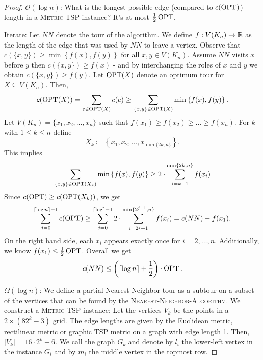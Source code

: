 \documentclass[../skript.tex]{subfiles}
\begin{document}
\begin{proof}
$\mathcal{O}(\log n)$: What is the longest possible edge (compared to $c(\operatorname{OPT})$) length in a \textsc{Metric TSP} instance? It's at most $\frac{1}{2} \operatorname{OPT}$.

Iterate: Let $NN$ denote the tour of the algorithm. We define $f : V(K_n) \to \mathbb{R}$ as the length of the edge that was used by $NN$ to leave a vertex. Observe that $c(\{ x, y \}) \geq \min \left\{ f(x), f(y) \right\}$ for all $x, y \in V(K_n)$.
Assume $NN$ visits $x$ before $y$ then $c(\{ x, y\}) \geq f(x)$ - and by interchanging the roles of $x$ and $y$ we obtain $c(\{x, y\}) \geq f(y)$.
Let $\operatorname{OPT}(X)$ denote an optimum tour for $X \subseteq V(K_n)$. Then,
\[
	c(\operatorname{OPT}(X)) = \sum_{e \in \operatorname{OPT}(X)} c(e) \geq \sum_{\{x, y\} \in \operatorname{OPT}(X)} \min\left\{ f(x), f(y) \right\}.
\]
Let $V(K_n) = \{ x_1, x_2, \ldots, x_n \}$ such that $f(x_1) \geq f(x_2) \geq \ldots \geq f(x_n)$.
For $k$ with $1 \leq k \leq n$ define
\[
	X_k \coloneqq \left\{ x_1, x_2, \ldots, x_{\min\{2k, n\}} \right\}.
\]
This implies
\[
	\sum_{\{x, y\} \in \operatorname{OPT}(X_k)} \min\left\{ f(x), f(y) \right\} \geq 2 \cdot \sum_{i=k+1}^{\min\{2k, n\}} f(x_i)
\]
Since $c(\operatorname{OPT}) \geq c(\operatorname{OPT}(X_k))$, we get
\[
	\sum_{j=0}^{\lceil \log n \rceil - 1} c(\operatorname{OPT}) \geq \sum_{j=0}^{\lceil \log \rceil - 1} 2 \cdot \sum_{i=2^j + 1}^{\min\{2^{j+1}, n\}} f(x_i) = c(NN) - f(x_1).
\]
On the right hand side, each $x_i$ appears exactly once for $i = 2, \ldots, n$. Additionally, we know $f(x_1) \leq \frac{1}{2} \operatorname{OPT}$.
Overall we get
\[
	c(NN) \leq \left( \lceil \log n \rceil + \frac{1}{2} \right) \cdot \operatorname{OPT}.
\]

$\Omega(\log n)$: We define a partial Nearest-Neighbor-tour as a subtour on a subset of the vertices that can be found by the \textsc{Nearest-Neighbor-Algorithm}. We construct a \textsc{Metric TSP} instance: Let the vertices $V_k$ be the points in a $2 \times (8 2^k - 3)$ grid. The edge lengths are given by the Euclidean metric, rectilinear metric or graphic TSP metric on a graph with edge length 1.
Then, $|V_k| = 16 \cdot 2^k - 6$. We call the graph $G_k$ and denote by $l_i$ the lower-left vertex in the instance $G_i$ and by $m_i$ the middle vertex in the topmost row.


\end{proof}
\end{document}
